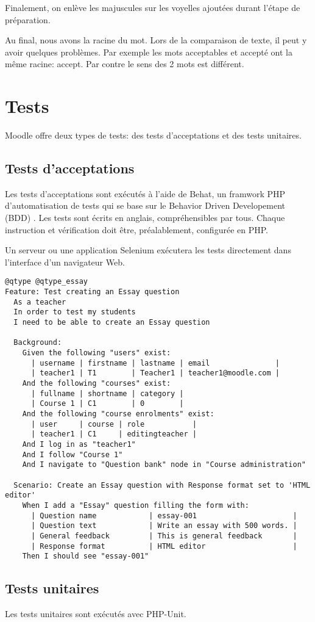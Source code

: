 Finalement, on enlève les majuscules sur les voyelles ajoutées durant l'étape de préparation.

Au final, nous avons la racine du mot. Lors de la comparaison de texte, il peut y avoir quelques problèmes. Par exemple les mots acceptables et accepté ont la même racine: accept. Par contre le sens des 2 mots est différent.

\section{Tests}

Moodle offre deux types de tests: des tests d'acceptations et des tests unitaires.

\subsection{Tests d'acceptations}

Les tests d'acceptations sont exécutés à l'aide de Behat, un \og framwork \fg{} PHP d'automatisation de tests qui se base sur le \og Behavior Driven Developement (BDD) \fg{}. Les tests sont écrits en anglais, compréhensibles par tous. Chaque instruction et vérification doit être, préalablement, configurée en PHP.

Un serveur ou une application Selenium exécutera les tests directement dans l'interface d'un navigateur Web.

\begin{lstlisting}[frame=l]
@qtype @qtype_essay
Feature: Test creating an Essay question
  As a teacher
  In order to test my students
  I need to be able to create an Essay question

  Background:
    Given the following "users" exist:
      | username | firstname | lastname | email               |
      | teacher1 | T1        | Teacher1 | teacher1@moodle.com |
    And the following "courses" exist:
      | fullname | shortname | category |
      | Course 1 | C1        | 0        |
    And the following "course enrolments" exist:
      | user     | course | role           |
      | teacher1 | C1     | editingteacher |
    And I log in as "teacher1"
    And I follow "Course 1"
    And I navigate to "Question bank" node in "Course administration"

  Scenario: Create an Essay question with Response format set to 'HTML editor'
    When I add a "Essay" question filling the form with:
      | Question name            | essay-001                      |
      | Question text            | Write an essay with 500 words. |
      | General feedback         | This is general feedback       |
      | Response format          | HTML editor                    |
    Then I should see "essay-001"
\end{lstlisting}

\subsection{Tests unitaires}

Les tests unitaires sont exécutés avec PHP-Unit.

